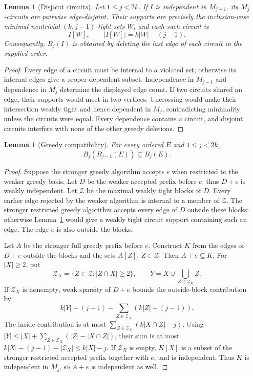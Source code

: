 \documentclass[11pt,a4paper]{article}
\newtheorem{lemma}[theorem]{Lemma}
\theoremstyle{definition}
\theoremstyle{remark}
\newcommand{\Bj}[2]{B_{#1}(#2)}
\begin{document}
\begin{lemma}[Disjoint circuits]\label{lem:circuits}
Let $1\leq j<2k$. If $I$ is independent in $M_{j-1}$, its $M_j$-circuits are
pairwise edge-disjoint. Their supports are precisely the
inclusion-wise minimal nontrivial $(k,j-1)$-tight sets $W$, and
each such circuit is
\[
 I[W],\qquad |I[W]|=k|W|-(j-1).
\]
Consequently, $\Bj jI$ is obtained by deleting the last edge of
each circuit in the supplied order.
\end{lemma}
\begin{proof}
Every edge of a circuit must be internal to a violated set;
otherwise its internal edges give a proper dependent subset.
Independence in $M_{j-1}$ and dependence in $M_j$ determine the
displayed edge count. If two circuits shared an edge, their
supports would meet in two vertices. Uncrossing would make their
intersection weakly tight and hence dependent in $M_j$,
contradicting minimality unless the circuits were equal.
Every dependence contains a circuit, and disjoint circuits
interfere with none of the other greedy deletions.
\end{proof}

\begin{lemma}[Greedy compatibility]\label{lem:compatibility}
For every ordered $E$ and $1\leq j<2k$,
\[
 \Bj j{\Bj{j-1}E}\subseteq\Bj jE.
\]
\end{lemma}
\begin{proof}
Suppose the stronger greedy algorithm accepts $e$ when restricted
to the weaker greedy basis. Let $D$ be the weaker accepted prefix
before $e$; thus $D+e$ is weakly independent. Let $\mathcal Z$
be the maximal weakly tight blocks of $D$.
Every earlier edge rejected by the weaker algorithm is internal
to a member of $\mathcal Z$. The stronger restricted greedy
algorithm accepts every edge of $D$ outside these blocks:
otherwise Lemma~\ref{lem:circuits} would give a weakly tight
circuit support containing such an edge. The edge $e$ is also
outside the blocks.

Let $A$ be the stronger full greedy prefix before $e$. Construct
$K$ from the edges of $D+e$ outside the blocks and the sets
$A[Z]$, $Z\in\mathcal Z$. Then $A+e\subseteq K$.
For $|X|\geq2$, put
\[
 \mathcal Z_X=\{Z\in\mathcal Z:|Z\cap X|\geq2\},
 \qquad Y=X\cup\bigcup_{Z\in\mathcal Z_X}Z.
\]
If $\mathcal Z_X$ is nonempty, weak sparsity of $D+e$ bounds
the outside-block contribution by
\[
 k|Y|-(j-1)
 -\sum_{Z\in\mathcal Z_X}(k|Z|-(j-1)).
\]
The inside contribution is at most
$\sum_{Z\in\mathcal Z_X}(k|X\cap Z|-j)$. Using
$|Y|\leq |X|+\sum_{Z\in\mathcal Z_X}(|Z|-|X\cap Z|)$, their sum is at most
$k|X|-(j-1)-|\mathcal Z_X|\leq k|X|-j$.
If $\mathcal Z_X$ is empty, $K[X]$ is a subset of the stronger
restricted accepted prefix together with $e$, and is independent.
Thus $K$ is independent in $M_j$, so $A+e$ is independent as well.
\end{proof}
\end{document}
